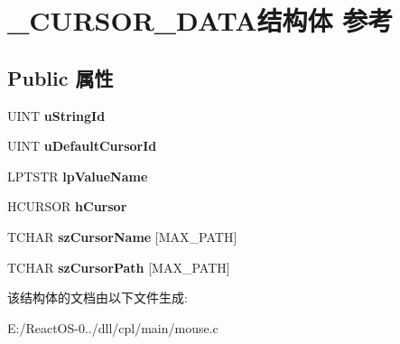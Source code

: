 \hypertarget{struct___c_u_r_s_o_r___d_a_t_a}{}\section{\+\_\+\+C\+U\+R\+S\+O\+R\+\_\+\+D\+A\+T\+A结构体 参考}
\label{struct___c_u_r_s_o_r___d_a_t_a}
\subsection*{Public 属性}
\begin{DoxyCompactItemize}
\item 
\mbox{\label{struct___c_u_r_s_o_r___d_a_t_a_ae7daba121bb28536f5b6dcb8b2539e42}} 
U\+I\+NT {\bfseries u\+String\+Id}
\item 
\mbox{\label{struct___c_u_r_s_o_r___d_a_t_a_a0748cbce6772a7dc44f9f48439b4d8ba}} 
U\+I\+NT {\bfseries u\+Default\+Cursor\+Id}
\item 
\mbox{\label{struct___c_u_r_s_o_r___d_a_t_a_abecf493af2303a1cbb77c8d7db0b50ce}} 
L\+P\+T\+S\+TR {\bfseries lp\+Value\+Name}
\item 
\mbox{\label{struct___c_u_r_s_o_r___d_a_t_a_a23b8a451d5a7bb7316e30479dcdc08c3}} 
H\+C\+U\+R\+S\+OR {\bfseries h\+Cursor}
\item 
\mbox{\label{struct___c_u_r_s_o_r___d_a_t_a_aa55d656ac2dfbb808cae911f7878f6ea}} 
T\+C\+H\+AR {\bfseries sz\+Cursor\+Name} \mbox{[}M\+A\+X\+\_\+\+P\+A\+TH\mbox{]}
\item 
\mbox{\label{struct___c_u_r_s_o_r___d_a_t_a_abb11a4895971074929658cfd17445278}} 
T\+C\+H\+AR {\bfseries sz\+Cursor\+Path} \mbox{[}M\+A\+X\+\_\+\+P\+A\+TH\mbox{]}
\end{DoxyCompactItemize}


该结构体的文档由以下文件生成\+:\begin{DoxyCompactItemize}
\item 
E\+:/\+React\+O\+S-\/0../dll/cpl/main/mouse.\+c\end{DoxyCompactItemize}
